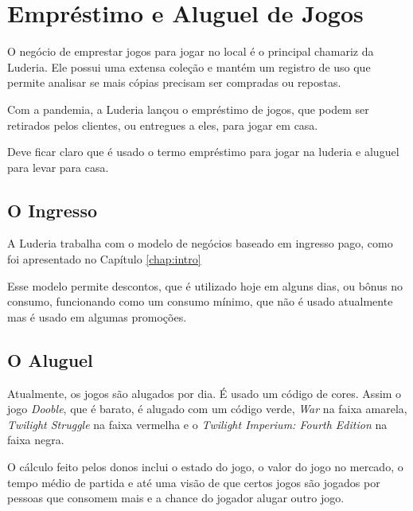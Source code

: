 \chapter{Empréstimo e Aluguel de Jogos}
\label{chap:aluguel}

O negócio de emprestar jogos para jogar no local é o principal chamariz da Luderia. Ele possui uma extensa coleção e mantém um registro de uso que permite analisar se mais cópias precisam ser compradas ou repostas.

Com a pandemia, a Luderia lançou o empréstimo de jogos, que podem ser retirados pelos clientes, ou entregues a eles, para jogar em casa.

Deve ficar claro que é usado o termo empréstimo para jogar na luderia e aluguel para levar para casa.

\section{O Ingresso}

A Luderia trabalha com o modelo de negócios baseado em ingresso pago, como foi apresentado no Capítulo \ref{chap:intro}

Esse modelo permite descontos, que é utilizado hoje em alguns dias, ou bônus no consumo, funcionando como um consumo mínimo, que não é usado atualmente mas é usado em algumas promoções.


\section{O Aluguel}

Atualmente, os jogos são alugados por dia. É usado um  código de cores. Assim o jogo \textit{Dooble}, que é barato, é alugado com um código verde, \textit{War} na faixa amarela,  \textit{Twilight Struggle} na faixa vermelha e o \textit{Twilight Imperium: Fourth Edition} na faixa negra. 

O cálculo feito pelos donos inclui o estado do jogo, o valor do jogo no mercado, o tempo médio de partida e até uma visão de que certos jogos são jogados por pessoas que consomem mais e a chance do jogador alugar outro jogo. 



